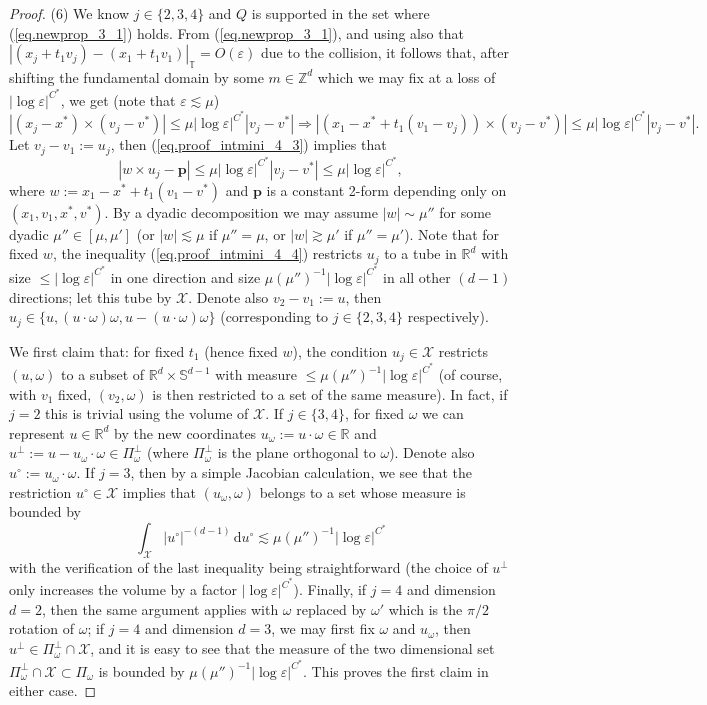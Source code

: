 \documentclass[10pt, reqno]{amsart}
\newcommand{\Rb}{\mathbb R}
\newcommand{\Sb}{\mathbb S}
\newcommand{\Tb}{\mathbb T}
\newcommand{\Zb}{\mathbb Z}
\newcommand{\Xc}{\mathcal X}
\theoremstyle{definition}
\theoremstyle{remark}
\numberwithin{equation}{section}
\begin{document}
\begin{proof}
(6) We know $j\in\{2,3,4\}$ and $Q$ is supported in the set where (\ref{eq.newprop_3_1}) holds. From (\ref{eq.newprop_3_1}), and using also that $|(x_j+t_1v_j)-(x_1+t_1v_1)|_\Tb=O(\varepsilon)$ due to the collision, it follows that, after shifting the fundamental domain by some $m\in\Zb^d$ which we may fix at a loss of $|\log\varepsilon|^{C^*}$, we get (note that $\varepsilon\lesssim\mu$)
\begin{equation}\label{eq.proof_intmini_4_3}
  |(x_j-x^*)\times(v_j-v^*)|\leq \mu|\log\varepsilon|^{C^*}|v_j-v^*|\Rightarrow  |(x_1-x^*+t_1(v_1-v_j))\times(v_j-v^*)|\leq \mu|\log\varepsilon|^{C^*}|v_j-v^*|.
\end{equation} Let $v_j-v_1:=u_j$, then (\ref{eq.proof_intmini_4_3}) implies that
\begin{equation}\label{eq.proof_intmini_4_4}
   |w\times u_j-\boldsymbol{p}|\leq \mu|\log\varepsilon|^{C^*}|v_j-v^*|\leq \mu|\log\varepsilon|^{C^*},
 \end{equation} where $w:=x_1-x^*+t_1(v_1-v^*)$ and $\boldsymbol{p}$ is a constant 2-form depending only on $(x_1,v_1,x^*,v^*)$. By a dyadic decomposition we may assume $|w|\sim\mu''$ for some dyadic $\mu''\in[\mu,\mu']$ (or $|w|\lesssim\mu$ if $\mu''=\mu$, or $|w|\gtrsim\mu'$ if $\mu''=\mu'$). Note that for fixed $w$, the inequality (\ref{eq.proof_intmini_4_4}) restricts $u_j$ to a tube in $\Rb^d$ with size $\leq|\log\varepsilon|^{C^*}$ in one direction and size $\mu(\mu'')^{-1}|\log\varepsilon|^{C^*}$ in all other $(d-1)$ directions; let this tube by $\Xc$. Denote also $v_2-v_1:=u$, then $u_j\in\{u,(u\cdot\omega)\omega,u-(u\cdot\omega)\omega\}$ (corresponding to $j\in\{2,3,4\}$ respectively).

 We first claim that: for fixed $t_1$ (hence fixed $w$), the condition $u_j\in\Xc$ restricts $(u,\omega)$ to a subset of $\Rb^d\times\Sb^{d-1}$ with measure $\leq \mu(\mu'')^{-1}|\log\varepsilon|^{C^*}$ (of course, with $v_1$ fixed, $(v_2,\omega)$ is then restricted to a set of the same measure). In fact, if $j=2$ this is trivial using the volume of $\Xc$. If $j\in\{3,4\}$, for fixed $\omega$ we can represent $u\in\Rb^d$ by the new coordinates $u_\omega:=u\cdot\omega\in\Rb$ and $u^\perp:=u-u_\omega\cdot\omega\in\Pi_\omega^\perp$ (where $\Pi_\omega^\perp$ is the plane orthogonal to $\omega$). Denote also $u^\circ:=u_\omega\cdot\omega$. If $j=3$, then by a simple Jacobian calculation, we see that the restriction $u^\circ\in\Xc$ implies that $(u_\omega,\omega)$ belongs to a set whose measure is bounded by
 \[\int_\Xc|u^\circ|^{-(d-1)}\,\mathrm{d}u^\circ\lesssim\mu(\mu'')^{-1}|\log\varepsilon|^{C^*}\] with the verification of the last inequality being straightforward (the choice of $u^\perp$ only increases the volume by a factor $|\log\varepsilon|^{C^*}$). Finally, if $j=4$ and dimension $d=2$, then the same argument applies with $\omega$ replaced by $\omega'$ which is the $\pi/2$ rotation of $\omega$; if $j=4$ and dimension $d=3$, we may first fix $\omega$ and $u_\omega$, then $u^\perp\in \Pi_\omega^\perp\cap \Xc$, and it is easy to see that the measure of the two dimensional set $\Pi_\omega^\perp\cap \Xc\subset\Pi_\omega$ is bounded by $\mu(\mu'')^{-1}|\log\varepsilon|^{C^*}$. This proves the first claim in either case.


\end{proof}
\end{document}
